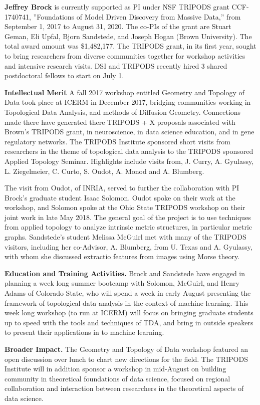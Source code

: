 

\textbf{Jeffrey Brock} is currently supported as PI under NSF TRIPODS grant CCF-1740741, ''Foundations of Model Driven Discovery from Massive Data,'' from September 1, 2017 to August 31, 2020. The co-PIs of the grant are Stuart Geman, Eli Upfal, Bjorn Sandstede, and Joseph Hogan (Brown University). The total award amount was \$1,482,177. The TRIPODS grant, in its first year, sought to bring researchers from diverse communities together for workshop activities and intensive research visits. DSI and TRIPODS recently hired 3 shared postdoctoral fellows to start on July 1.

\textbf{Intellectual Merit} A fall 2017 workshop entitled Geometry and Topology of Data took place at ICERM in December 2017, bridging communities working in Topological Data Analysis, and methods of Diffusion Geometry. Connections made there have generated there TRIPODS + X proposals associated with Brown's TRIPODS grant, in neuroscience, in data science education, and in gene regulatory networks. 
The TRIPODS Institute sponsored short visits from researchers in the theme of topological data analysis to the TRIPODS sponsored Applied Topology Seminar. Highlights include visits from, J. Curry, A. Gyulassy, L. Ziegelmeier, C. Curto, S. Oudot, A. Monod and A. Blumberg.

The visit from Oudot, of INRIA, served to further the collaboration with PI Brock's graduate student Isaac Solomon. Oudot spoke on their work at the workshop, and Solomon spoke at the Ohio State TRIPODS workshop on their joint work  \citep{Oudot:Solomon:persistence} in late May 2018. The general goal of the project is to use techniques from applied topology to analyze intrinsic metric structures, in particular metric graphs. Sandstede's student Melissa McGuirl met with many of the TRIPODS visitors, including her co-Advisor, A. Blumberg, from U. Texas and A. Gyulassy, with whom she discussed extractio features from images using Morse theory. 

{\bf Education and Training Activities.}
Brock and Sandstede have engaged in planning a week long summer bootcamp with Solomon, McGuirl, and Henry Adams of Colorado State, who will spend a week in early August presenting the framework of topological data analysis in the context of machine learning. This week long workshop (to run at ICERM) will focus on bringing graduate students up to speed with the tools and techniques of TDA, and bring in outside speakers to present their applications in to machine learning.

{\bf Broader Impact.} The Geometry and Topology of Data workshop featured an open discussion over lunch to chart new directions for the field. The TRIPODS Institute will in addition sponsor a workshop in mid-August on building community in theoretical foundations of data science, focused on regional collaboration and interaction between researchers in the theoretical aspects of data science.
